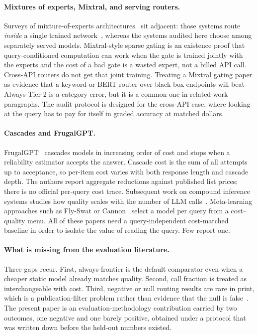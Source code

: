 \documentclass[a4paper,twoside]{article}
\begin{document}
\paragraph{Mixtures of experts, Mixtral, and serving routers.}
Surveys of mixture-of-experts architectures~\cite{yue2024mixtralstyle} sit adjacent: those systems route \emph{inside} a single trained network~\cite{shazeer2017moe,fedus2022switch,jiang2024mixtral}, whereas the systems audited here choose among separately served models. Mixtral-style sparse gating is an existence proof that query-conditioned computation can work when the gate is trained jointly with the experts and the cost of a bad gate is a wasted expert, not a billed API call. Cross-API routers do not get that joint training. Treating a Mixtral gating paper as evidence that a keyword or BERT router over black-box endpoints will beat Always-Tier-2 is a category error, but it is a common one in related-work paragraphs. The audit protocol is designed for the cross-API case, where looking at the query has to pay for itself in graded accuracy at matched dollars.

\paragraph{Cascades and FrugalGPT.}
FrugalGPT~\cite{chen2023frugalgpt} cascades models in increasing order of cost and stops when a reliability estimator accepts the answer. Cascade cost is the sum of all attempts up to acceptance, so per-item cost varies with both response length and cascade depth. The authors report aggregate reductions against published list prices; there is no official per-query cost trace. Subsequent work on compound inference systems studies how quality scales with the number of LLM calls~\cite{chen2024cascade}. Meta-learning approaches such as Fly-Swat or Cannon~\cite{sakota2024fly} select a model per query from a cost--quality menu. All of these papers need a query-independent cost-matched baseline in order to isolate the value of reading the query. Few report one.

\paragraph{What is missing from the evaluation literature.}
Three gaps recur. First, always-frontier is the default comparator even when a cheaper static model already matches quality. Second, call fraction is treated as interchangeable with cost. Third, negative or null routing results are rare in print, which is a publication-filter problem rather than evidence that the null is false~\cite{gelman2013garden,nosek2018prereg}. The present paper is an evaluation-methodology contribution carried by two outcomes, one negative and one barely positive, obtained under a protocol that was written down before the held-out numbers existed.
\end{document}
